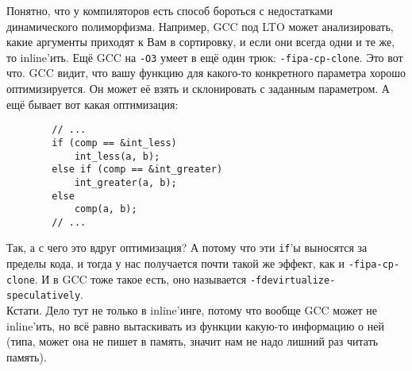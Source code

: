 \documentclass{article}
\begin{document}
    Понятно, что у компиляторов есть способ бороться с недостатками динамического полиморфизма. Например, GCC под LTO может анализировать, какие аргументы приходят к Вам в сортировку, и если они всегда одни и те же, то inline'ить. Ещё GCC на \texttt{-O3} умеет в ещё один трюк: \texttt{-fipa-cp-clone}. Это вот что. GCC видит, что вашу функцию для какого-то конкретного параметра хорошо оптимизируется. Он может её взять и склонировать с заданным параметром. А ещё бывает вот какая оптимизация:
    \begin{verbatim}
        // ...
        if (comp == &int_less)
            int_less(a, b);
        else if (comp == &int_greater)
            int_greater(a, b);
        else
            comp(a, b);
        // ...
    \end{verbatim}
    Так, а с чего это вдруг оптимизация? А потому что эти \texttt{if}'ы выносятся за пределы кода, и тогда у нас получается почти такой же эффект, как и \texttt{-fipa-cp-clone}. И в GCC тоже такое есть, оно называется \texttt{-fdevirtualize-speculatively}.\\
    Кстати. Дело тут не только в inline'инге, потому что вообще GCC может не inline'ить, но всё равно вытаскивать из функции какую-то информацию о ней (типа, может она не пишет в память, значит нам не надо лишний раз читать память).
\end{document}
